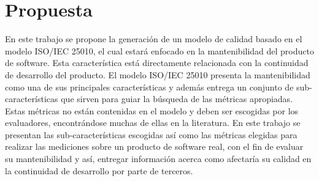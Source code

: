 
\chapter{Propuesta}
En este trabajo se propone la generación de un modelo de calidad basado en el 
modelo ISO/IEC 25010, el cual estará enfocado en la mantenibilidad del producto 
de software. Esta característica está directamente relacionada con la 
continuidad de desarrollo del producto.
El modelo ISO/IEC 25010 presenta la mantenibilidad como una de sus principales
características y además entrega un conjunto de sub-características que sirven para
guiar la búsqueda de las métricas apropiadas.
Estas métricas no están contenidas en el modelo y deben ser escogidas por los evaluadores, 
encontrándose muchas de ellas en la literatura.
En este trabajo se presentan las sub-características escogidas así como las 
métricas elegidas para realizar las mediciones sobre un producto de software real, 
con el fin de evaluar su mantenibilidad y así, entregar información acerca como afectaría
su calidad en la continuidad de desarrollo por parte de terceros.

